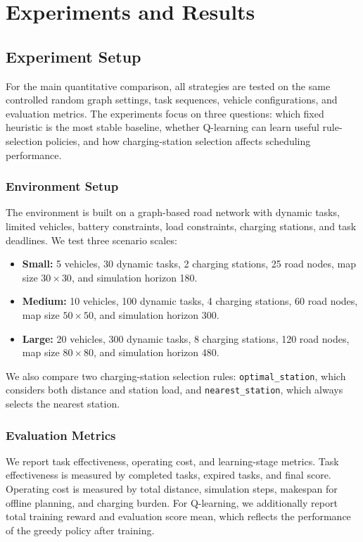 \section{Experiments and Results}
\subsection{Experiment Setup}

For the main quantitative comparison, all strategies are tested on the same controlled random graph settings, task sequences, vehicle configurations, and evaluation metrics. The experiments focus on three questions: which fixed heuristic is the most stable baseline, whether Q-learning can learn useful rule-selection policies, and how charging-station selection affects scheduling performance.

\subsubsection{Environment Setup}
The environment is built on a graph-based road network with dynamic tasks, limited vehicles, battery constraints, load constraints, charging stations, and task deadlines. We test three scenario scales:
\begin{itemize}
    \item \textbf{Small:} 5 vehicles, 30 dynamic tasks, 2 charging stations, 25 road nodes, map size \(30\times 30\), and simulation horizon 180.
    \item \textbf{Medium:} 10 vehicles, 100 dynamic tasks, 4 charging stations, 60 road nodes, map size \(50\times 50\), and simulation horizon 300.
    \item \textbf{Large:} 20 vehicles, 300 dynamic tasks, 8 charging stations, 120 road nodes, map size \(80\times 80\), and simulation horizon 480.
\end{itemize}
We also compare two charging-station selection rules: \texttt{optimal\_station}, which considers both distance and station load, and \texttt{nearest\_station}, which always selects the nearest station.

\subsubsection{Evaluation Metrics}
We report task effectiveness, operating cost, and learning-stage metrics. Task effectiveness is measured by completed tasks, expired tasks, and final score. Operating cost is measured by total distance, simulation steps, makespan for offline planning, and charging burden. For Q-learning, we additionally report total training reward and evaluation score mean, which reflects the performance of the greedy policy after training.

